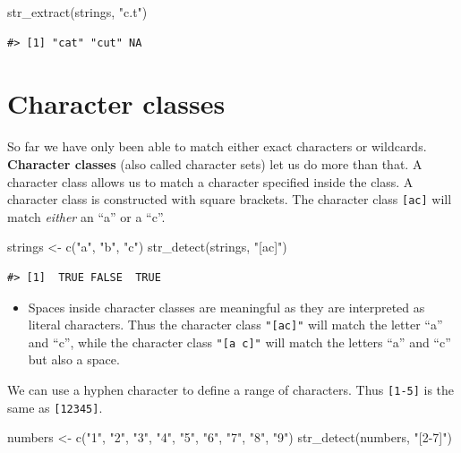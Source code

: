 \documentclass[
]{krantz}
\makeatletter
\newenvironment{Shaded}{\begin{snugshade}}{\end{snugshade}}
\newcommand{\FunctionTok}[1]{\textcolor[rgb]{0.00,0.00,0.00}{#1}}
\newcommand{\NormalTok}[1]{#1}
\newcommand{\OtherTok}[1]{\textcolor[rgb]{0.56,0.35,0.01}{#1}}
\newcommand{\StringTok}[1]{\textcolor[rgb]{0.31,0.60,0.02}{#1}}
\newenvironment{kframe}{%
\medskip{}
\setlength{\fboxsep}{.8em}
 \def\at@end@of@kframe{}%
 \ifinner\ifhmode%
  \def\at@end@of@kframe{\end{minipage}}%
  \begin{minipage}{\columnwidth}%
 \fi\fi%
 \def\FrameCommand##1{\hskip\@totalleftmargin \hskip-\fboxsep
 \colorbox{shadecolor}{##1}\hskip-\fboxsep
     \hskip-\linewidth \hskip-\@totalleftmargin \hskip\columnwidth}%
 \MakeFramed {\advance\hsize-\width
   \@totalleftmargin\z@ \linewidth\hsize
   \@setminipage}}%
 {\par\unskip\endMakeFramed%
 \at@end@of@kframe}
\renewenvironment{Shaded}{\begin{kframe}}{\end{kframe}}
\newenvironment{rmdblock}[1]
  {\begin{shaded*}
  \begin{itemize}[left = -1cm, labelsep = 1cm]
  \renewcommand{\labelitemi}{
    \raisebox{-.7\height}[0pt][0pt]{
      {\setkeys{Gin}{width=3em,keepaspectratio}\texttt{[image: images/\#1]}}
    }
  }
 
  \item
  }
  {
  \end{itemize}
  \end{shaded*}
  }
\newenvironment{rmdnote}
  {\begin{rmdblock}{note}}
  {\end{rmdblock}}
\makeatother
\begin{document}
\begin{Shaded}
\begin{Highlighting}[]
\FunctionTok{str\_extract}\NormalTok{(strings, }\StringTok{"c.t"}\NormalTok{)}
\end{Highlighting}
\end{Shaded}

\begin{verbatim}
#> [1] "cat" "cut" NA
\end{verbatim}

\hypertarget{character-classes}{%
\section{Character classes}\label{character-classes}}

So far we have only been able to match either exact characters or wildcards. \textbf{Character classes} (also called character sets) let us do more than that. A character class allows us to match a character specified inside the class. A character class is constructed with square brackets. The character class \texttt{{[}ac{]}} will match \emph{either} an ``a'' or a ``c''.

\begin{Shaded}
\begin{Highlighting}[]
\NormalTok{strings }\OtherTok{\textless{}{-}} \FunctionTok{c}\NormalTok{(}\StringTok{"a"}\NormalTok{, }\StringTok{"b"}\NormalTok{, }\StringTok{"c"}\NormalTok{)}
\FunctionTok{str\_detect}\NormalTok{(strings, }\StringTok{"[ac]"}\NormalTok{)}
\end{Highlighting}
\end{Shaded}

\begin{verbatim}
#> [1]  TRUE FALSE  TRUE
\end{verbatim}

\begin{rmdnote}
Spaces inside character classes are meaningful as they are interpreted
as literal characters. Thus the character class \texttt{"{[}ac{]}"} will
match the letter ``a'' and ``c'', while the character class
\texttt{"{[}a\ c{]}"} will match the letters ``a'' and ``c'' but also a
space.
\end{rmdnote}

We can use a hyphen character to define a range of characters. Thus \texttt{{[}1-5{]}} is the same as \texttt{{[}12345{]}}.

\begin{Shaded}
\begin{Highlighting}[]
\NormalTok{numbers }\OtherTok{\textless{}{-}} \FunctionTok{c}\NormalTok{(}\StringTok{"1"}\NormalTok{, }\StringTok{"2"}\NormalTok{, }\StringTok{"3"}\NormalTok{, }\StringTok{"4"}\NormalTok{, }\StringTok{"5"}\NormalTok{, }\StringTok{"6"}\NormalTok{, }\StringTok{"7"}\NormalTok{, }\StringTok{"8"}\NormalTok{, }\StringTok{"9"}\NormalTok{)}
\FunctionTok{str\_detect}\NormalTok{(numbers, }\StringTok{"[2{-}7]"}\NormalTok{)}
\end{Highlighting}
\end{Shaded}
\end{document}
